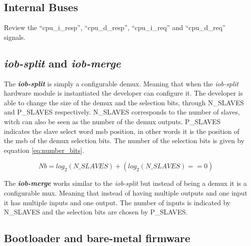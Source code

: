 \subsection{Internal Buses}
Review the \enquote{cpu\_i\_resp}, \enquote{cpu\_d\_resp}, \enquote{cpu\_i\_req} and \enquote{cpu\_d\_req} signals.

\subsection{\textit{iob-split} and \textit{iob-merge}}
The \textbf{\textit{iob-split}} is simply a configurable \acrfull{demux}. Meaning that when the \textit{iob-split} hardware module is instantiated the developer can configure it. The developer is able to change the size of the \acrlong{demux} and the selection bits, through N\_SLAVES and P\_SLAVES respectively. N\_SLAVES corresponds to the number of slaves, witch can also be seen as the number of the \acrshort{demux} outputs. P\_SLAVES indicates the slave select word \acrfull{msb} position, in other words it is the position of the \acrshort{msb} of the \acrlong{demux} selection bits. The number of the selection bits is given by equation \ref{eq:number_bits}.

\begin{equation}
    \label{eq:number_bits}
    Nb = log_2(N\_SLAVES)+(log_2(N\_SLAVES)==0)
\end{equation}

The \textbf{\textit{iob-merge}} works similar to the \textit{iob-split} but instead of being a \acrshort{demux} it is a configurable \acrfull{mux}. Meaning that instead of having multiple outputs and one input it has multiple inputs and one output. The number of inputs is indicated by N\_SLAVES and the selection bits are chosen by P\_SLAVES.

\subsection{Bootloader and bare-metal firmware}


